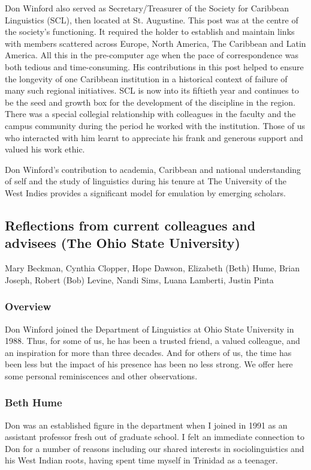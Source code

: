 \documentclass[output=paper, colorlinks,citecolor=brown]{langscibook}
\begin{document}
Don Winford also served as Secretary/Treasurer of the Society for Caribbean Linguistics (SCL), then located at St. Augustine. This post was at the centre of the society’s functioning. It required the holder to establish and maintain links with members scattered across Europe, North America, The Caribbean and Latin America. All this in the pre-computer age when the pace of correspondence was both tedious and time-consuming. His contributions in this post helped to ensure the longevity of one Caribbean institution in a historical context of failure of many such regional initiatives. SCL is now into its fiftieth year and continues to be the seed and growth box for the development of the discipline in the region. There was a special collegial relationship with colleagues in the faculty and the campus community during the period he worked with the institution. Those of us who interacted with him learnt to appreciate his frank and generous support and valued his work ethic.

Don Winford’s contribution to academia, Caribbean and national understanding of self and the study of linguistics during his tenure at The University of the West Indies provides a significant model for emulation by emerging scholars.



\subsection{Reflections from current colleagues and advisees (The Ohio State University)}

Mary Beckman, Cynthia Clopper, Hope Dawson, Elizabeth (Beth) Hume, Brian Joseph, Robert (Bob) Levine, Nandi Sims, Luana Lamberti, Justin Pinta

\subsubsection {Overview}
Don Winford joined the Department of Linguistics at Ohio State University in 1988. Thus, for some of us, he has been a trusted friend, a valued colleague, and an inspiration for more than three decades.  And for others of us, the time has been less but the impact of his presence has been no less strong. We offer here some personal reminiscences and other observations.

\subsubsection{Beth Hume} Don was an established figure in the department when I joined in 1991 as an assistant professor fresh out of graduate school. I felt an immediate connection to Don for a number of reasons including our shared interests in sociolinguistics and his West Indian roots, having spent time myself in Trinidad as a teenager. 
\end{document}

